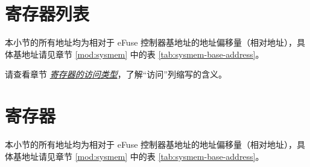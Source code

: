 \documentclass[main\_\_CN.tex]{subfiles}
\begin{document}

\clearpage
\section{寄存器列表}
\label{sec:efuse-reg-summ}
\hypertarget{efuse-reg-summ}{}

本小节的所有地址均为相对于 eFuse 控制器基地址的地址偏移量（相对地址），具体基地址请见章节 \ref{mod:sysmem} \textit{} 中的表 \ref{tab:sysmem-base-address}。

请查看章节 \hyperref[glossary-access-types]{\textit{寄存器的访问类型}}，了解“访问”列缩写的含义。





\clearpage
\section{寄存器}

本小节的所有地址均为相对于 eFuse 控制器基地址的地址偏移量（相对地址），具体基地址请见章节 \ref{mod:sysmem} \textit{} 中的表 \ref{tab:sysmem-base-address}。


\end{document}
